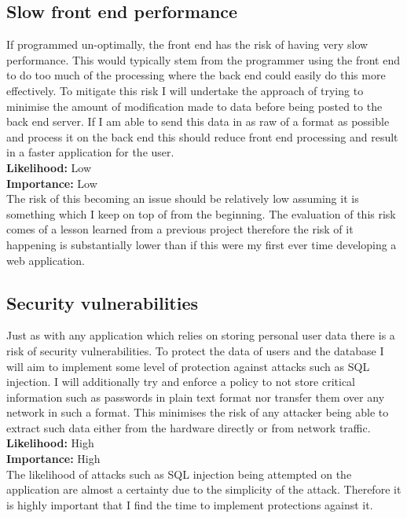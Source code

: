 \documentclass{article}
\begin{document}
\subsection{Slow front end performance}
If programmed un-optimally, the front end has the risk of having very slow performance. This would typically stem from the programmer using the front end to do too much of the processing where the back end could easily do this more effectively. To mitigate this risk I will undertake the approach of trying to minimise the amount of modification made to data before being posted to the back end server. If I am able to send this data in as raw of a format as possible and process it on the back end this should reduce front end processing and result in a faster application for the user.\\

\noindent
\textbf{Likelihood:} Low\\
\textbf{Importance:} Low\\

\noindent
The risk of this becoming an issue should be relatively low assuming it is something which I keep on top of from the beginning. The evaluation of this risk comes of a lesson learned from a previous project therefore the risk of it happening is substantially lower than if this were my first ever time developing a web application.

\subsection{Security vulnerabilities}
Just as with any application which relies on storing personal user data there is a risk of security vulnerabilities. To protect the data of users and the database I will aim to implement some level of protection against attacks such as SQL injection. I will additionally try and enforce a policy to not store critical information such as passwords in plain text format nor transfer them over any network in such a format. This minimises the risk of any attacker being able to extract such data either from the hardware directly or from network traffic.\\

\noindent
\textbf{Likelihood:} High\\
\textbf{Importance:} High\\

\noindent
The likelihood of attacks such as SQL injection being attempted on the application are almost a certainty due to the simplicity of the attack. Therefore it is highly important that I find the time to implement protections against it.
\end{document}
